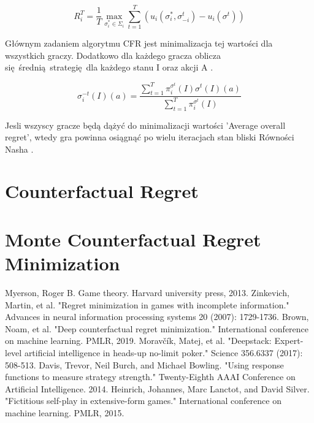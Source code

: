 \documentclass[12pt,oneside,a4paper]{report}
\begin{document}
\begin{equation}
   R^{T}_{i} = \frac{1}{T} \max_{\sigma^{*}_{i} \in \Sigma_{i}} \sum_{t=1}^{T}
   \left(u_{i}\left(\sigma_{i}^{*}, \sigma_{-i}^{t}\right) - u_{i}(\sigma^{t})\right)
\end{equation}

Głównym zadaniem algorytmu CFR jest minimalizacja tej wartości dla wszystkich graczy.
Dodatkowo dla każdego gracza oblicza się średnią strategię dla 
każdego stanu I oraz akcji A \cite{rmg}.

\begin{equation}
   \sigma^{-t}_{i} \left(I\right) \left(a\right) = \frac{\sum^{T}_{t=1} \pi^{\sigma^{t}}_{i}
   (I)\sigma^{t}(I)(a)}{\sum^{T}_{t=1} \pi^{\sigma^{t}}_{i}(I)}
\end{equation}

Jesli wszyscy gracze będą dążyć do minimalizacji wartości 'Average overall regret', wtedy gra
powinna osiągnąć po wielu iteracjach stan bliski Równości Nasha \cite{rmg}.



\section{Counterfactual Regret}

\section{Monte Counterfactual Regret Minimization}
 

\begin{thebibliography}{100}
    Myerson, Roger B. Game theory. Harvard university press, 2013.
    Zinkevich, Martin, et al. "Regret minimization in games with incomplete information." Advances in neural information processing systems 20 (2007): 1729-1736.
    Brown, Noam, et al. "Deep counterfactual regret minimization." International conference on machine learning. PMLR, 2019. 
    Moravčík, Matej, et al. "Deepstack: Expert-level artificial intelligence in heads-up no-limit poker." Science 356.6337 (2017): 508-513. 
    Davis, Trevor, Neil Burch, and Michael Bowling. "Using response functions to measure strategy strength." Twenty-Eighth AAAI Conference on Artificial Intelligence. 2014. 
    Heinrich, Johannes, Marc Lanctot, and David Silver. "Fictitious self-play in extensive-form games." International conference on machine learning. PMLR, 2015. 
\end{thebibliography}
\end{document}
